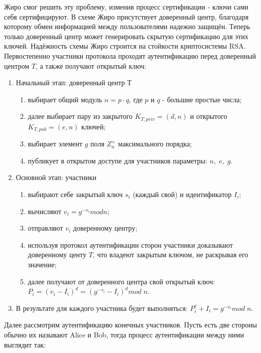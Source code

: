 \documentclass[a4paper]{article}
\begin{document}
Жиро смог решить эту проблему, изменив процесс сертификации - ключи сами себя сертифицируют. В схеме Жиро присутствует доверенный центр,  благодаря которому обмен информацией 
между пользователями надежно защищён. Теперь только доверенный центр может генерировать скрытую сертификацию для этих ключей. 
Надёжность схемы Жиро строится на стойкости криптосистемы RSA.
\\
Первостепенно участники протокола проходят аутентификацию перед доверенный центром $T$, а также получают открытый ключ:
\begin{enumerate}
    \item Начальный этап: доверенный центр Т 
    \begin{enumerate}
        \item выбирает общий модуль $n = p \cdot q$, где $p$ и $q$ - большие простые числа;
        \item далее выбирает пару из закрытого $K_{T, priv} = (d,n)$ и открытого $K_{T, pub}=(e,n)$ ключей; 
        \item выбирает элемент $g$ поля $Z_n^\times$ максимального порядка;
        \item публикует в открытом доступе для участников параметры: $n, \; e, \; g$.
    \end{enumerate}
    \item Основной этап: участники 
    \begin{enumerate}
        \item выбирают себе закрытый ключ $s_i$ (каждый свой) и идентификатор $I_i$;
        \item вычисляют $v_i = g ^{-s_i} mod n$;
        \item отправляют $v_i$ доверенному центру;
        \item используя протокол аутентификации сторон участники доказывают доверенному центу $T$, что владеют закрытым ключом, не раскрывая его значение;
        \item далее получают от доверенного центра свой открытый ключ: $P_i = (v_i - I_i)^d = (g^{-s_i} -I_i)^d mod \; n$.
    \end{enumerate}
    \item В результате для каждого участника будет выполняться: $P_i^e+I_i = g^{-s_i} mod \; n$.
\end{enumerate}
Далее рассмотрим аутентификацию конечных участников. Пусть есть две стороны обычно их называют Alice и Bob, тогда процесс аутентификации между ними выглядит так:
\end{document}

